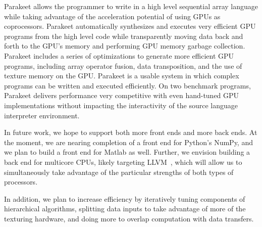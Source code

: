 \documentclass[10pt,twocolumn]{article}
\begin{document}
Parakeet allows the programmer to write in a high level sequential array language while taking advantage of the acceleration potential of using GPUs as coprocessors. Parakeet automatically synthesizes and executes very efficient GPU programs from the high level code while transparently moving data back and forth to the GPU's memory and performing GPU memory garbage collection. Parakeet includes a series of optimizations to generate more efficient GPU programs, including array operator fusion, data transposition, and the use of texture memory on the GPU.  Parakeet is a usable system in which complex programs can be written and executed efficiently.  On two benchmark programs, Parakeet delivers performance very competitive with even hand-tuned GPU implementations without impacting the interactivity of the source language interpreter environment.

In future work, we hope to support both more front ends and more back ends.  At the moment, we are nearing completion of a front end for Python's NumPy, and we plan to build a front end for Matlab as well.  Further, we envision building a back end for multicore CPUs, likely targeting LLVM~\cite{Latt02}, which will allow us to simultaneously take advantage of the particular strengths of both types of processors.

In addition, we plan to increase efficiency by iteratively tuning components of hierarchical algorithms, splitting data inputs to take advantage of more of the texturing hardware, and doing more to overlap computation with data transfers.

{\small

{}
}
\end{document}
